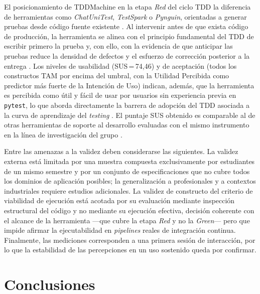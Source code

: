 \documentclass[10pt,journal,twoside,letterpaper]{IEEEtran}
\begin{document}
	El posicionamiento de TDDMachine en la etapa \emph{Red} del ciclo TDD la diferencia de herramientas como \emph{ChatUniTest}, \emph{TestSpark} o \emph{Pynguin}, orientadas a generar pruebas desde código fuente existente \cite{chen2024chatunitest,sapozhnikov2024testspark,lukasczyk2022pynguin}. Al intervenir antes de que exista código de producción, la herramienta se alinea con el principio fundamental del TDD de escribir primero la prueba y, con ello, con la evidencia de que anticipar las pruebas reduce la densidad de defectos y el esfuerzo de corrección posterior a la entrega \cite{nagappan2008tdd,rafique2013meta,erdogmus2005testfirst}. Los niveles de usabilidad (SUS\,=\,74,46) y de aceptación (todos los constructos TAM por encima del umbral, con la Utilidad Percibida como predictor más fuerte de la Intención de Uso) indican, además, que la herramienta es percibida como útil y fácil de usar por usuarios sin experiencia previa en \texttt{pytest}, lo que aborda directamente la barrera de adopción del TDD asociada a la curva de aprendizaje del \emph{testing} \cite{ghafari2020inconclusive,bangor2009sus,davis1989tam}. El puntaje SUS obtenido es comparable al de otras herramientas de soporte al desarrollo evaluadas con el mismo instrumento en la línea de investigación del grupo \cite{guerrero2025tddtool}.

	Entre las amenazas a la validez deben considerarse las siguientes. La validez externa está limitada por una muestra compuesta exclusivamente por estudiantes de un mismo semestre y por un conjunto de especificaciones que no cubre todos los dominios de aplicación posibles; la generalización a profesionales y a contextos industriales requiere estudios adicionales. La validez de constructo del criterio de viabilidad de ejecución está acotada por su evaluación mediante inspección estructural del código y no mediante su ejecución efectiva, decisión coherente con el alcance de la herramienta ---que cubre la etapa \emph{Red} y no la \emph{Green}--- pero que impide afirmar la ejecutabilidad en \emph{pipelines} reales de integración continua. Finalmente, las mediciones corresponden a una primera sesión de interacción, por lo que la estabilidad de las percepciones en un uso sostenido queda por confirmar.

	\section{Conclusiones}
	\label{sec:conclusiones}
\end{document}
